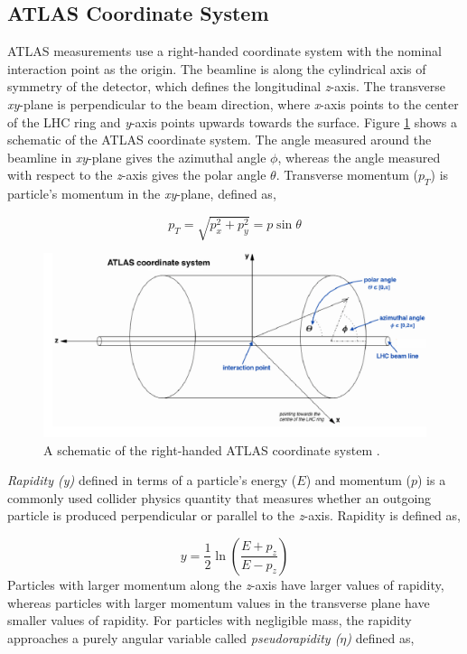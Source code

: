 \subsection{ATLAS Coordinate System}
\label{subsec:ATLASCS}

ATLAS measurements use a right-handed coordinate system with the nominal interaction point as the origin. The beamline is along the cylindrical axis of symmetry of the detector, which defines the longitudinal \textit{z}-axis. The transverse \textit{xy}-plane is perpendicular to the beam direction, where \textit{x}-axis points to the center of the LHC ring and \textit{y}-axis points upwards towards the surface. Figure \ref{fig:ATLAS_CS} shows a schematic of the ATLAS coordinate system. The angle measured around the beamline in \textit{xy}-plane gives the azimuthal angle $\phi$, whereas the angle measured with respect to the \textit{z}-axis gives the polar angle $\theta$. Transverse momentum ($p_{T}$) is particle's momentum in the \textit{xy}-plane, defined as, 

\begin{equation}
p_{T} = \sqrt{p_{x}^2+p_{y}^2}=p\sin\theta
\label{eqn:pT}
\end{equation}
\begin{figure}
    \centering
    \includegraphics[width=.98\linewidth]{figures/LHC/ATLAS_CoordinateSys.png}
    \caption{ A schematic of the right-handed ATLAS coordinate system \cite{ATLAS_CoordSys}.\label{fig:ATLAS_CS}}
\end{figure}

\textit{Rapidity (y)} defined in terms of a particle's energy ($E$) and momentum ($p$) is a commonly used collider physics quantity that measures whether an outgoing particle is produced perpendicular or parallel to the \textit{z}-axis. Rapidity is defined as, 

\begin{equation}
    y = \frac{1}{2}\ln{ \left( \frac{E+p_{z}}{E-p_{z}} \right) }
    \label{eqn:Rapidity}
\end{equation}
Particles with larger momentum along the \textit{z}-axis have larger values of rapidity, whereas particles with larger momentum values in the transverse plane have smaller values of rapidity. For particles with negligible mass, the rapidity approaches a purely angular variable called \textit{pseudorapidity ($\eta$)} defined as, 

